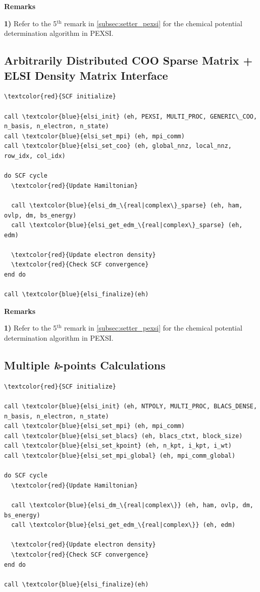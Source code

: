 \documentclass{report}
\begin{document}
\textbf{Remarks}

\textbf{1)} Refer to the 5$^\text{th}$ remark in \ref{subsec:setter_pexsi} for the chemical potential determination algorithm in PEXSI.

\subsection*{Arbitrarily Distributed COO Sparse Matrix + ELSI Density Matrix Interface}
\begin{tcolorbox}
\begin{Verbatim}[commandchars=\\\{\}]
\textcolor{red}{SCF initialize}

call \textcolor{blue}{elsi_init} (eh, PEXSI, MULTI_PROC, GENERIC\_COO, n_basis, n_electron, n_state)
call \textcolor{blue}{elsi_set_mpi} (eh, mpi_comm)
call \textcolor{blue}{elsi_set_coo} (eh, global_nnz, local_nnz, row_idx, col_idx)

do SCF cycle
  \textcolor{red}{Update Hamiltonian}

  call \textcolor{blue}{elsi_dm_\{real|complex\}_sparse} (eh, ham, ovlp, dm, bs_energy)
  call \textcolor{blue}{elsi_get_edm_\{real|complex\}_sparse} (eh, edm)

  \textcolor{red}{Update electron density}
  \textcolor{red}{Check SCF convergence}
end do

call \textcolor{blue}{elsi_finalize}(eh)
\end{Verbatim}
\end{tcolorbox}

\textbf{Remarks}

\textbf{1)} Refer to the 5$^\text{th}$ remark in \ref{subsec:setter_pexsi} for the chemical potential determination algorithm in PEXSI.

\subsection*{Multiple \textbf{\textit{k}}-points Calculations}
\begin{tcolorbox}
\begin{Verbatim}[commandchars=\\\{\}]
\textcolor{red}{SCF initialize}

call \textcolor{blue}{elsi_init} (eh, NTPOLY, MULTI_PROC, BLACS_DENSE, n_basis, n_electron, n_state)
call \textcolor{blue}{elsi_set_mpi} (eh, mpi_comm)
call \textcolor{blue}{elsi_set_blacs} (eh, blacs_ctxt, block_size)
call \textcolor{blue}{elsi_set_kpoint} (eh, n_kpt, i_kpt, i_wt)
call \textcolor{blue}{elsi_set_mpi_global} (eh, mpi_comm_global)

do SCF cycle
  \textcolor{red}{Update Hamiltonian}

  call \textcolor{blue}{elsi_dm_\{real|complex\}} (eh, ham, ovlp, dm, bs_energy)
  call \textcolor{blue}{elsi_get_edm_\{real|complex\}} (eh, edm)

  \textcolor{red}{Update electron density}
  \textcolor{red}{Check SCF convergence}
end do

call \textcolor{blue}{elsi_finalize}(eh)
\end{Verbatim}
\end{tcolorbox}
\end{document}

